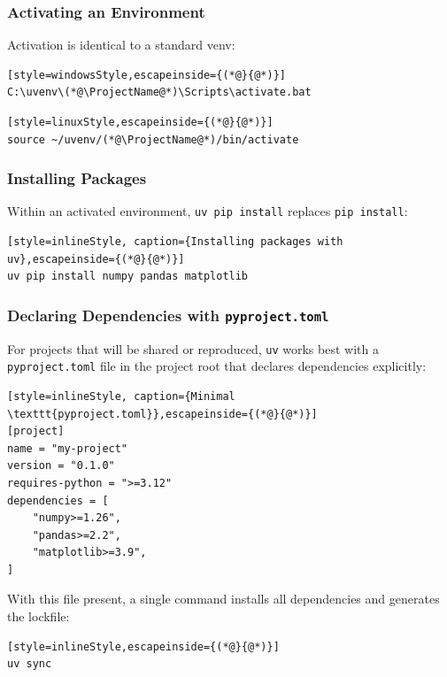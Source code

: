 \subsubsection{Activating an Environment}

Activation is identical to a standard venv:

\begin{lstlisting}[style=windowsStyle,escapeinside={(*@}{@*)}]
C:\uvenv\(*@\ProjectName@*)\Scripts\activate.bat
\end{lstlisting}

\begin{lstlisting}[style=linuxStyle,escapeinside={(*@}{@*)}]
source ~/uvenv/(*@\ProjectName@*)/bin/activate
\end{lstlisting}

\subsubsection{Installing Packages}

Within an activated environment, \texttt{uv pip install} replaces
\texttt{pip install}:

\begin{lstlisting}[style=inlineStyle, caption={Installing packages with uv},escapeinside={(*@}{@*)}]
uv pip install numpy pandas matplotlib
\end{lstlisting}

\subsubsection{Declaring Dependencies with \texttt{pyproject.toml}}

For projects that will be shared or reproduced, \texttt{uv} works best
with a \texttt{pyproject.toml} file in the project root that declares
dependencies explicitly:

\begin{lstlisting}[style=inlineStyle, caption={Minimal \texttt{pyproject.toml}},escapeinside={(*@}{@*)}]
[project]
name = "my-project"
version = "0.1.0"
requires-python = ">=3.12"
dependencies = [
    "numpy>=1.26",
    "pandas>=2.2",
    "matplotlib>=3.9",
]
\end{lstlisting}

With this file present, a single command installs all dependencies and
generates the lockfile:

\begin{lstlisting}[style=inlineStyle,escapeinside={(*@}{@*)}]
uv sync
\end{lstlisting}


